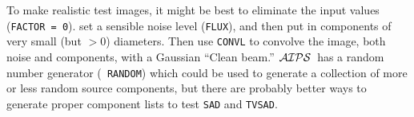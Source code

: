 \documentclass[twoside]{article}
\newcommand{\AIPS}{{$\cal AIPS\/$}}
\begin{document}
To make realistic test images, it might be best to eliminate the input
values ({\tt FACTOR = 0}). set a sensible noise level ({\tt FLUX}),
and then put in components of very small (but $> 0$) diameters.  Then
use {\tt CONVL} to convolve the image, both noise and components, with
a Gaussian ``Clean beam.''  \AIPS\ has a random number generator ({\tt
  RANDOM}) which could be used to generate a collection of more or
less random source components, but there are probably better ways to
generate proper component lists to test {\tt SAD} and {\tt TVSAD}\@.
\end{document}
